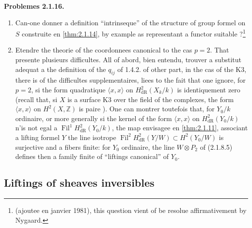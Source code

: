 \documentclass[12pt,a4paper]{article}
\theoremstyle{plain}
\theoremstyle{definition}
\theoremstyle{remark}
\DeclareMathOperator{\Fil}{Fil}
\begin{document}
\textbf{Problemes 2.1.16.}
\begin{enumerate}[label=\alph*)]
\item Can-one donner a definition ``intrinseque'' of the structure of group formel on $S$ construite en \ref{thm:2.1.14}, by example as representant a functor suitable ?\footnote{(ajoutee en janvier 1981), this question vient of be resolue affirmativement by Nygaard.}
\item Etendre the theorie of the coordonnees canonical to the cas $p = 2$. That presente plusieurs difficultes. All of abord, bien entendu, trouver a substitut adequat a the definition of the $q_{ij}$ of 1.4.2. of other part, in the cas of the K3, there is of the difficultes supplementaires, liees to the fait that one ignore, for $p = 2$, si the form quadratique $\langle x, x \rangle$ on $H^2_\mathrm{dR}(X_k/k)$ is identiquement zero (recall that, si $X$ is a surface K3 over the field of the complexes, the form $\langle x, x \rangle$ on $H^2(X, \mathbb{Z})$ is paire \cite{Shafarevitch}). One can montrer toutefois \cite{Deligne1976} that, for $Y_0/k$ ordinaire, or more generally si the kernel of the form $\langle x, x \rangle$ on $H^2_\mathrm{dR}(Y_0/k)$ n'is not egal a $\Fil^1 H^2_\mathrm{dR}(Y_0/k)$, the map envisagee en \ref{thm:2.1.11}, associant a lifting formel $Y$ the line isotrope $\Fil^2 H^2_\mathrm{dR}(Y/W) \subset H^2(Y_0/W)$ is surjective and a fibers finite: for $Y_0$ ordinaire, the line $W \otimes P_2$ of (2.1.8.5) defines then a family finite of ``liftings canonical'' of $Y_0$.
\end{enumerate}

\subsection{Liftings of sheaves inversibles}
\end{document}
